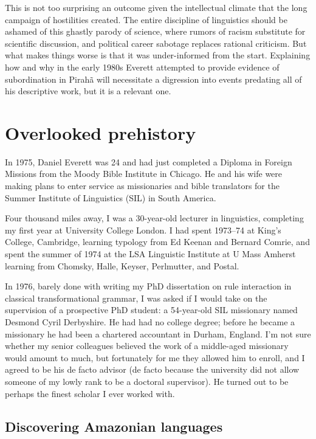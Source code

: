 \documentclass[output=paper,colorlinks,citecolor=brown
]{langscibook}
\begin{document}
This is not too surprising an outcome given the intellectual climate
that the long campaign of hostilities created. The entire discipline
of linguistics should be ashamed of this ghastly parody of science,
where rumors of racism substitute for scientific discussion, and
political career sabotage replaces rational criticism. But what makes
things worse is that it was under-informed from the start. Explaining
how and why in the early 1980s Everett attempted to provide evidence
of subordination in Pirah{\~a} will necessitate a digression into
events predating all of his descriptive work, but it is a relevant
one.

\section{Overlooked prehistory}\label{prehistory}

In 1975, Daniel Everett was 24 and had just completed a Diploma
in Foreign Missions from the Moody Bible Institute in Chicago. He and
his wife were making plans to enter service as missionaries and bible
translators for the Summer Institute of Linguistics (SIL) in South
America.

Four thousand miles away, I was a 30-year-old lecturer in linguistics,
completing my first year at University College London. I had spent
1973--74 at King's College, Cambridge, learning typology from Ed
Keenan and Bernard Comrie, and spent the summer of 1974 at the LSA
Linguistic Institute at U Mass Amherst learning from Chomsky, Halle,
Keyser, Perlmutter, and Postal.

In 1976, barely done with writing my PhD dissertation on rule interaction
in classical transformational grammar, I was asked if I would take
on the supervision of a prospective PhD student: a 54-year-old SIL
missionary named Desmond Cyril Derbyshire. He had had no college
degree; before he became a missionary he had been a chartered
accountant in Durham, England. I'm not sure whether my senior colleagues
believed the work of a middle-aged missionary would amount to much, but
fortunately for me they allowed him to enroll, and I agreed to be his
de facto advisor (de facto because the university did not allow someone
of my lowly rank to be a doctoral supervisor). He turned out to be
perhaps the finest scholar I ever worked with.

\subsection{Discovering Amazonian languages}
\end{document}
